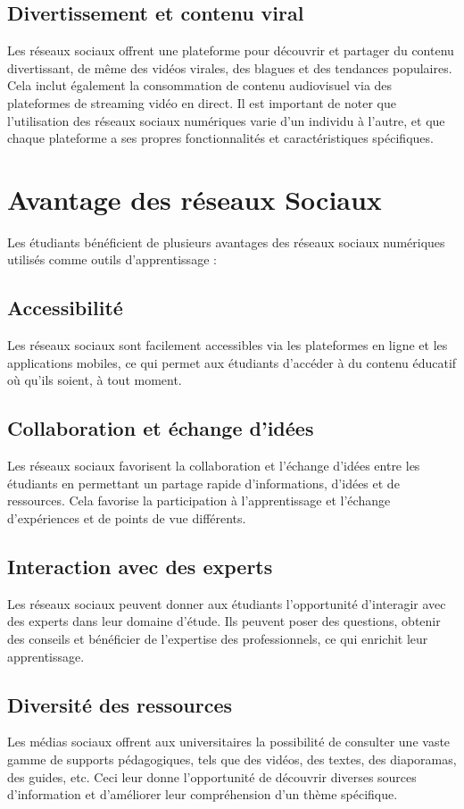 \documentclass[12pt,a4paper,titlepage]{article}
\begin{document}
\subsection{Divertissement et contenu viral  }
 Les réseaux sociaux offrent une plateforme pour découvrir et partager du contenu divertissant, de même des vidéos virales, des blagues et des tendances populaires. Cela inclut également la consommation de contenu audiovisuel via des plateformes de streaming vidéo en direct.  \newline
 Il est important de noter que l'utilisation des réseaux sociaux numériques varie d'un individu à l'autre, et que chaque plateforme a ses propres fonctionnalités et caractéristiques spécifiques. 
 \section{Avantage des réseaux Sociaux  }
 Les étudiants bénéficient de plusieurs avantages des réseaux sociaux numériques utilisés comme outils d'apprentissage :  
 \subsection{Accessibilité}
 Les réseaux sociaux sont facilement accessibles via les plateformes en ligne et les applications mobiles, ce qui permet aux étudiants d'accéder à du contenu éducatif où qu'ils soient, à tout moment.
\subsection{Collaboration et échange d'idées }
Les réseaux sociaux favorisent la collaboration et l'échange d'idées entre les étudiants en permettant un partage rapide d'informations, d'idées et de ressources. Cela favorise la participation à l'apprentissage et l'échange d'expériences et de points de vue différents.
\subsection{Interaction avec des experts }
Les réseaux sociaux peuvent donner aux étudiants l'opportunité d'interagir avec des experts dans leur domaine d'étude. Ils peuvent poser des questions, obtenir des conseils et bénéficier de l'expertise des professionnels, ce qui enrichit leur apprentissage.
\subsection{Diversité des ressources }
Les médias sociaux offrent aux universitaires la possibilité de consulter une vaste gamme de supports pédagogiques, tels que des vidéos, des textes, des diaporamas, des guides, etc. Ceci leur donne l'opportunité de découvrir diverses sources d'information et d'améliorer leur compréhension d'un thème spécifique. 
\end{document}
